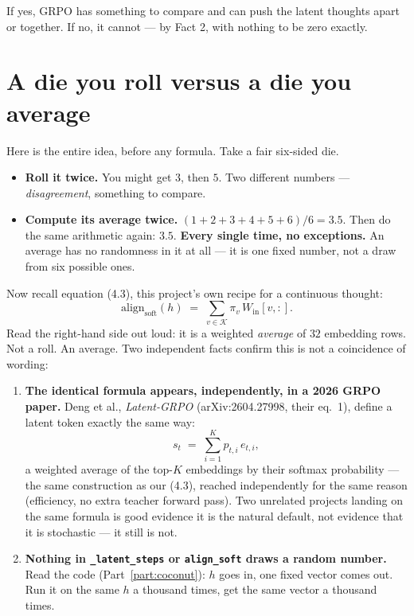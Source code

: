 \documentclass[11pt]{article}
\theoremstyle{definition}
\begin{document}
If yes, GRPO has something to compare and can push the latent thoughts apart or together. If no, it cannot --- by Fact 2, with nothing to be zero exactly.

\section{A die you roll versus a die you average}
\label{sec:dice}

Here is the entire idea, before any formula. Take a fair six-sided die.

\begin{itemize}
\item \textbf{Roll it twice.} You might get $3$, then $5$. Two different numbers --- \emph{disagreement}, something to compare.
\item \textbf{Compute its average twice.} $(1+2+3+4+5+6)/6 = 3.5$. Then do the same arithmetic again: $3.5$. \textbf{Every single time, no exceptions.} An average has no randomness in it at all --- it is one fixed number, not a draw from six possible ones.
\end{itemize}

\begin{center}
\end{center}

Now recall equation (4.3), this project's own recipe for a continuous thought:
\[
\mathrm{align}_{\mathrm{soft}}(h) \;=\; \sum_{v\in\mathcal{K}} \pi_v\, W_{\mathrm{in}}[v,:].
\]
Read the right-hand side out loud: it is a weighted \emph{average} of $32$ embedding rows. Not a roll. An average. Two independent facts confirm this is not a coincidence of wording:

\begin{enumerate}
\item \textbf{The identical formula appears, independently, in a 2026 GRPO paper.} Deng et al., \emph{Latent-GRPO} (arXiv:2604.27998, their eq.~1), define a latent token exactly the same way:
  \[
  s_t \;=\; \sum_{i=1}^{K} p_{t,i}\, e_{t,i},
  \]
a weighted average of the top-$K$ embeddings by their softmax probability --- the same construction as our (4.3), reached independently for the same reason (efficiency, no extra teacher forward pass). Two unrelated projects landing on the same formula is good evidence it is the natural default, not evidence that it is stochastic --- it still is not.
\item \textbf{Nothing in \texttt{\_latent\_steps} or \texttt{align\_soft} draws a random number.} Read the code (Part~\ref{part:coconut}): $h$ goes in, one fixed vector comes out. Run it on the same $h$ a thousand times, get the same vector a thousand times.
\end{enumerate}
\end{document}
